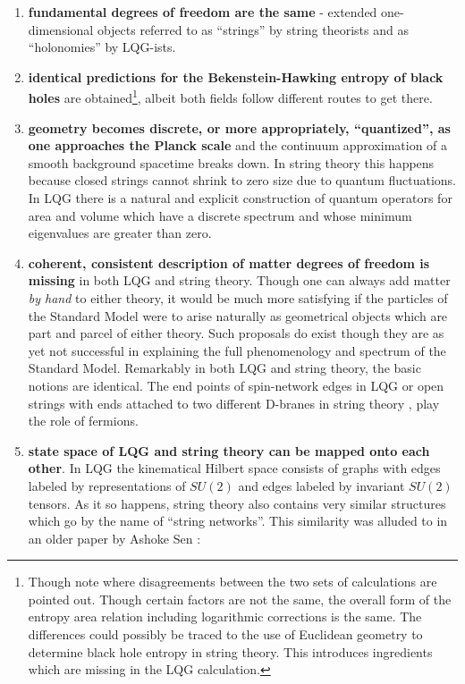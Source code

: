 \documentclass{ws-mpla}
\begin{document}
\begin{enumerate}
	\item \textbf{fundamental degrees of freedom are the same} - extended one-dimensional objects referred to as ``strings'' by string theorists and as ``holonomies'' by LQG-ists.
	\item \textbf{identical predictions \cite{Kaul2012Entropy,Sen2012Logarithmic} for the Bekenstein-Hawking entropy of black holes} are obtained\footnote{Though note \cite{Sen2012Logarithmic,Sen2014Microscopic} where disagreements between the two sets of calculations are pointed out. Though certain factors are not the same, the overall form of the entropy area relation including logarithmic corrections is the same. The differences could possibly be traced to the use of Euclidean geometry to determine black hole entropy in string theory. This introduces ingredients which are missing in the LQG calculation.}, albeit both fields follow different routes to get there.
	\item \textbf{geometry becomes discrete, or more appropriately, ``quantized'', as one approaches the Planck scale} and the continuum approximation of a smooth background spacetime breaks down. In string theory this happens because closed strings cannot shrink to zero size due to quantum fluctuations. In LQG there is a natural and explicit construction \cite{Ashtekar1992Weaving,Rovelli1993Area,Rovelli1994Discreteness} of quantum operators for area and volume which have a discrete spectrum and whose minimum eigenvalues are greater than zero.
	\item \textbf{coherent, consistent description of matter degrees of freedom is missing} in both LQG and string theory. Though one can always add matter \emph{by hand} to either theory, it would be much more satisfying if the particles of the Standard Model were to arise naturally as geometrical objects which are part and parcel of either theory. Such proposals do exist \cite{Bilson-Thompson2005A-topological,Bilson-Thompson2006Quantum,Vaid2010Embedding,Wan2007Braid} though they are as yet not successful in explaining the full phenomenology and spectrum of the Standard Model. Remarkably in both LQG and string theory, the basic notions are identical. The end points of spin-network edges in LQG \cite{Morales-Tecotl1994Fermions} or open strings with ends attached to two different D-branes in string theory \cite[Ch. 21]{Zwiebach2009A-First}, play the role of fermions.
	\item \textbf{state space of LQG and string theory can be mapped onto each other}. In LQG the kinematical Hilbert space consists of graphs with edges labeled by representations of $ SU(2) $ and edges labeled by invariant $ SU(2) $ tensors. As it so happens, string theory also contains very similar structures which go by the name of ``string networks''. This similarity was alluded to in an older paper by Ashoke Sen \cite{Sen1997String}:

\end{enumerate}
\end{document}
